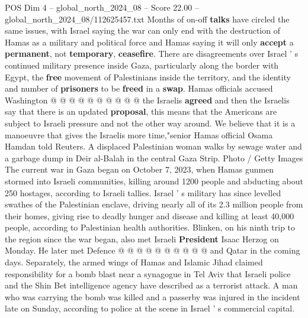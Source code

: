 \begin{textsample}{POS Dim 4 – global\_north\_2024\_08 – Score 22.00 – global\_north\_2024\_08/112625457.txt}
Months of on-off \textbf{talks} have circled the same issues, with Israel saying the war can only end with the destruction of Hamas as a military and political force and Hamas saying it will only \textbf{accept} a \textbf{permanent}, not \textbf{temporary}, \textbf{ceasefire}.
There are disagreements over Israel ' s continued military presence inside Gaza, particularly along the border with Egypt, the \textbf{free} movement of Palestinians inside the territory, and the identity and number of \textbf{prisoners} to be \textbf{freed} in a \textbf{swap}.
Hamas officials accused Washington @ @ @ @ @ @ @ @ @ @ the Israelis \textbf{agreed} and then the Israelis say that there is an updated \textbf{proposal}, this means that the Americans are subject to Israeli pressure and not the other way around.
We believe that it is a manoeuvre that gives the Israelis more time,"senior Hamas official Osama Hamdan told Reuters.
A displaced Palestinian woman walks by sewage water and a garbage dump in Deir al-Balah in the central Gaza Strip.
Photo / Getty Images The current war in Gaza began on October 7, 2023, when Hamas gunmen stormed into Israeli communities, killing around 1200 people and abducting about 250 hostages, according to Israeli tallies.
Israel ' s military has since levelled swathes of the Palestinian enclave, driving nearly all of its 2.3 million people from their homes, giving rise to deadly hunger and disease and killing at least 40,000 people, according to Palestinian health authorities.
Blinken, on his ninth trip to the region since the war began, also met Israeli \textbf{President} Isaac Herzog on Monday.
He later met Defence @ @ @ @ @ @ @ @ @ @ and Qatar in the coming days.
Separately, the armed wings of Hamas and Islamic Jihad claimed responsibility for a bomb blast near a synagogue in Tel Aviv that Israeli police and the Shin Bet intelligence agency have described as a terrorist attack.
A man who was carrying the bomb was killed and a passerby was injured in the incident late on Sunday, according to police at the scene in Israel ' s commercial capital.

\end{textsample}
